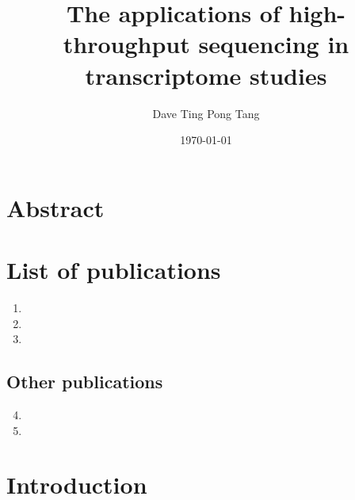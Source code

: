 \documentclass[10pt,a4paper]{report}
\begin{document}
%

\title{
   {The applications of high-throughput sequencing in transcriptome studies}
}

\author{Dave Ting Pong Tang}
\date{\today}
\maketitle

%

\chapter*{Abstract}


\chapter*{List of publications}

\begin{enumerate}
   \item {}
   \item {}
   \item {}
\end{enumerate}

\section*{Other publications}

\begin{enumerate}
   \setcounter{enumi}{3}
   \item {}
   \item {}
\end{enumerate}

\tableofcontents

\listoffigures



\chapter{Introduction}\label{intro}

\end{document}
